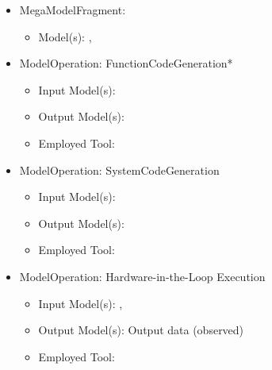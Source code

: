 %

\begin{itemize}
    \item MegaModelFragment: \CPSLabHiLMMF
    \begin{itemize}
        \item Model(s): \CPSLabControlModel*, \CPSLabSystemModel
    \end{itemize}
\end{itemize}


\begin{itemize}
    \item ModelOperation: FunctionCodeGeneration*
    \begin{itemize}
        \item Input Model(s): \CPSLabControlModel
        \item Output Model(s): \CPSLabControlModelCode
        \item Employed Tool: \dSPACETargetLink %
    \end{itemize}
    \item ModelOperation: SystemCodeGeneration
    \begin{itemize}
        \item Input Model(s): \CPSLabSystemModel
        \item Output Model(s): \CPSLabSystemModelCode
        \item Employed Tool: \dSPACESystemDesk %
    \end{itemize}
    \item ModelOperation: Hardware-in-the-Loop Execution
    \begin{itemize}
        \item Input Model(s): \CPSLabControlModelCode*, \CPSLabSystemModelCode
        \item Output Model(s): Output data (observed)
        \item Employed Tool: \RobotExecutionLocal %
    \end{itemize}
\end{itemize}

 
